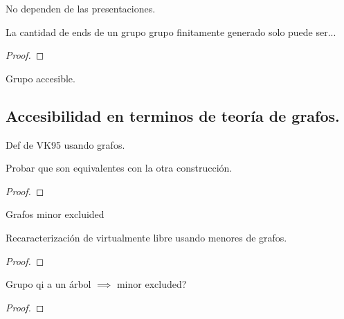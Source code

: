 \documentclass[tesis.tex]{subfiles}
\newcommand{\fg}{grupo finitamente generado }
\begin{document}
\begin{obs}
	No dependen de las presentaciones.
\end{obs}

\begin{teo}[Hopf]
	La cantidad de ends de un grupo \fg solo puede ser...
\end{teo}
\begin{proof}
\end{proof}

\begin{deff}
	Grupo accesible.
\end{deff}

\subsection{Accesibilidad en terminos de teoría de grafos.}

\begin{deff}
	Def de VK95 usando grafos.
\end{deff}

\begin{teo}
	Probar que son equivalentes con la otra construcción.
\end{teo}
\begin{proof}
	
\end{proof}


\begin{deff}
	Grafos minor excluided
\end{deff}

\begin{teo}[Khukro]
	Recaracterización de virtualmente libre usando menores de grafos.
\end{teo}
\begin{proof}
\end{proof}

\begin{teo}
	Grupo qi a un árbol $\implies$ minor excluded?
\end{teo}
\begin{proof}
\end{proof}
\end{document}
